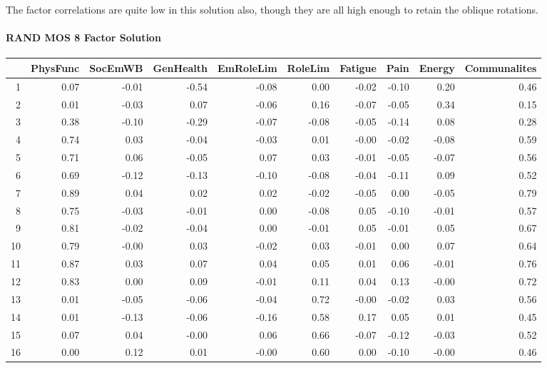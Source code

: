 \documentclass{article}
\begin{document}
The factor correlations are quite low in this solution also, though they are all high enough to retain the oblique rotations.




\paragraph{RAND MOS 8 Factor Solution}

\begin{table}[ht]
\centering
\begin{tabular}{rrrrrrrrrr}
  \hline
 & PhysFunc & SocEmWB & GenHealth & EmRoleLim & RoleLim & Fatigue & Pain & Energy & Communalites \\ 
  \hline
1 & 0.07 & -0.01 & -0.54 & -0.08 & 0.00 & -0.02 & -0.10 & 0.20 & 0.46 \\ 
  2 & 0.01 & -0.03 & 0.07 & -0.06 & 0.16 & -0.07 & -0.05 & 0.34 & 0.15 \\ 
  3 & 0.38 & -0.10 & -0.29 & -0.07 & -0.08 & -0.05 & -0.14 & 0.08 & 0.28 \\ 
  4 & 0.74 & 0.03 & -0.04 & -0.03 & 0.01 & -0.00 & -0.02 & -0.08 & 0.59 \\ 
  5 & 0.71 & 0.06 & -0.05 & 0.07 & 0.03 & -0.01 & -0.05 & -0.07 & 0.56 \\ 
  6 & 0.69 & -0.12 & -0.13 & -0.10 & -0.08 & -0.04 & -0.11 & 0.09 & 0.52 \\ 
  7 & 0.89 & 0.04 & 0.02 & 0.02 & -0.02 & -0.05 & 0.00 & -0.05 & 0.79 \\ 
  8 & 0.75 & -0.03 & -0.01 & 0.00 & -0.08 & 0.05 & -0.10 & -0.01 & 0.57 \\ 
  9 & 0.81 & -0.02 & -0.04 & 0.00 & -0.01 & 0.05 & -0.01 & 0.05 & 0.67 \\ 
  10 & 0.79 & -0.00 & 0.03 & -0.02 & 0.03 & -0.01 & 0.00 & 0.07 & 0.64 \\ 
  11 & 0.87 & 0.03 & 0.07 & 0.04 & 0.05 & 0.01 & 0.06 & -0.01 & 0.76 \\ 
  12 & 0.83 & 0.00 & 0.09 & -0.01 & 0.11 & 0.04 & 0.13 & -0.00 & 0.72 \\ 
  13 & 0.01 & -0.05 & -0.06 & -0.04 & 0.72 & -0.00 & -0.02 & 0.03 & 0.56 \\ 
  14 & 0.01 & -0.13 & -0.06 & -0.16 & 0.58 & 0.17 & 0.05 & 0.01 & 0.45 \\ 
  15 & 0.07 & 0.04 & -0.00 & 0.06 & 0.66 & -0.07 & -0.12 & -0.03 & 0.52 \\ 
  16 & 0.00 & 0.12 & 0.01 & -0.00 & 0.60 & 0.00 & -0.10 & -0.00 & 0.46 \\ 

\end{tabular}
\end{table}
\end{document}
